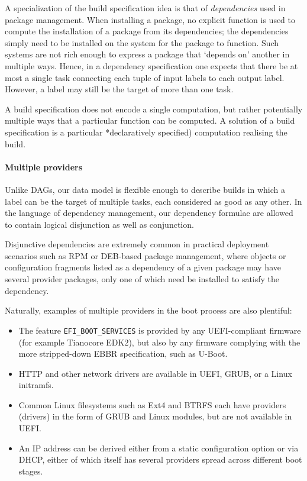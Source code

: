 \begin{example}[Dependencies]

  A specialization of the build specification idea is that of \emph{dependencies} used in package management.
  When installing a package, no explicit function is used to compute the installation of a package from its dependencies; the dependencies simply need to be installed on the system for the package to function.
  Such systems are not rich enough to express a package that `depends on' another in multiple ways.
  Hence, in a dependency specification one expects that there be at most a single task connecting each tuple of input labels to each output label.
  However, a label may still be the target of more than one task.

\end{example}

\begin{example} 
  
  A build specification does not encode a single computation, but rather potentially multiple ways that a particular function can be computed.
  A solution of a build specification is a particular *declaratively specified) computation realising the build.

\end{example}

\paragraph{Multiple providers}
%
Unlike DAGs, our data model is flexible enough to describe builds in which a label can be the target of multiple tasks, each considered as good as any other.
%
In the language of dependency management, our dependency formulae are allowed to contain logical disjunction as well as conjunction.

Disjunctive dependencies are extremely common in practical deployment scenarios such as RPM or DEB-based package management, where objects or configuration fragments listed as a dependency of a given package may have several provider packages, only one of which need be installed to satisfy the dependency.

Naturally, examples of multiple providers in the boot process are also plentiful:

\begin{itemize}
  \item
    The feature \texttt{EFI\_BOOT\_SERVICES} is provided by any UEFI-compliant firmware (for example Tianocore EDK2), but also by any firmware complying with the more stripped-down EBBR specification, such as U-Boot.
  \item
    HTTP and other network drivers are available in UEFI, GRUB, or a Linux initramfs.
  \item
    Common Linux filesystems such as Ext4 and BTRFS each have providers (drivers) in the form of GRUB and Linux modules, but are not available in UEFI.
  \item
    An IP address can be derived either from a static configuration option or via DHCP, either of which itself has several providers spread across different boot stages.
\end{itemize}

